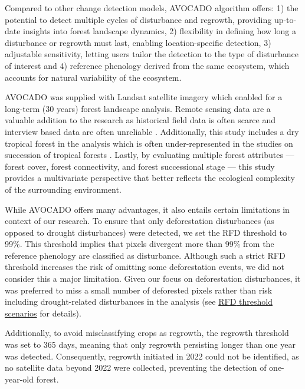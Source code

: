 Compared to other change detection models, \ac{AVOCADO} algorithm offers: 1) the potential to detect multiple cycles of disturbance and regrowth, providing up-to-date insights into forest landscape dynamics, 2) flexibility in defining how long a disturbance or regrowth must last, enabling location-specific detection, 3) adjustable sensitivity, letting users tailor the detection to the type of disturbance of interest and 4) reference phenology derived from the same ecosystem, which accounts for natural variability of the ecosystem. 

\ac{AVOCADO} was supplied with Landsat satellite imagery which enabled for a long-term (30 years) forest landscape analysis. Remote sensing data are a valuable addition to the research as historical field data is often scarce and interview based data are often unreliable \citep{decuyperContinuousMonitoringForest2022}. Additionally, this study includes a dry tropical forest in the analysis which is often under-represented in the studies on succession of tropical forests \citep{chazdonDriversBenefitsNatural2025}. Lastly, by evaluating multiple forest attributes — forest cover, forest connectivity, and forest successional stage — this study provides a multivariate perspective that better reflects the ecological complexity of the surrounding environment.

While \ac{AVOCADO} offers many advantages, it also entails certain limitations in context of our research. To ensure that only  deforestation disturbances (as opposed to drought disturbances) were detected, we set the \ac{RFD} threshold to 99\%. This threshold implies that pixels divergent more than 99\% from the reference phenology are classified as disturbance. Although such a strict \ac{RFD} threshold increases the risk of omitting some deforestation events, we did not consider this a major limitation. Given our focus on deforestation disturbances, it was preferred to miss a small number of deforested pixels rather than risk including drought-related disturbances in the analysis (see \href{https://github.com/Bianky/MSc-Thesis/blob/main/Analysis/avo_calibration.xlsx}{\ac{RFD} threshold scenarios} for details).

Additionally, to avoid misclassifying crops as regrowth, the regrowth threshold was set to 365 days, meaning that only regrowth persisting longer than one year was detected. Consequently, regrowth initiated in 2022 could not be identified, as no satellite data beyond 2022 were collected, preventing the detection of one-year-old forest. 

